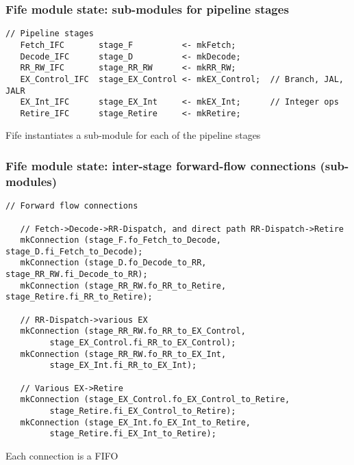 \begin{frame}[fragile]
\frametitle{Fife module state: sub-modules for pipeline stages}

\footnotesize

\begin{minipage}{0.75\textwidth}
\begin{Verbatim}[frame=single, label=From src\_Fife/CPU.bsv]
   // Pipeline stages
   Fetch_IFC       stage_F          <- mkFetch;
   Decode_IFC      stage_D          <- mkDecode;
   RR_RW_IFC       stage_RR_RW      <- mkRR_RW;
   EX_Control_IFC  stage_EX_Control <- mkEX_Control;  // Branch, JAL, JALR
   EX_Int_IFC      stage_EX_Int     <- mkEX_Int;      // Integer ops
   Retire_IFC      stage_Retire     <- mkRetire;
\end{Verbatim}
\end{minipage}
\hm
\begin{minipage}{0.22\textwidth}
Fife instantiates a sub-module for each of the pipeline stages
\end{minipage}



\end{frame}


\begin{frame}[fragile]
\frametitle{Fife module state: inter-stage forward-flow connections (sub-modules) }

\footnotesize

\begin{minipage}{0.75\textwidth}\scriptsize
\begin{Verbatim}[frame=single, label=From src\_Fife/CPU.bsv]
   // Forward flow connections

   // Fetch->Decode->RR-Dispatch, and direct path RR-Dispatch->Retire
   mkConnection (stage_F.fo_Fetch_to_Decode,  stage_D.fi_Fetch_to_Decode);
   mkConnection (stage_D.fo_Decode_to_RR,     stage_RR_RW.fi_Decode_to_RR);
   mkConnection (stage_RR_RW.fo_RR_to_Retire, stage_Retire.fi_RR_to_Retire);

   // RR-Dispatch->various EX
   mkConnection (stage_RR_RW.fo_RR_to_EX_Control,
		 stage_EX_Control.fi_RR_to_EX_Control);
   mkConnection (stage_RR_RW.fo_RR_to_EX_Int,
		 stage_EX_Int.fi_RR_to_EX_Int);

   // Various EX->Retire
   mkConnection (stage_EX_Control.fo_EX_Control_to_Retire,
		 stage_Retire.fi_EX_Control_to_Retire);
   mkConnection (stage_EX_Int.fo_EX_Int_to_Retire,
		 stage_Retire.fi_EX_Int_to_Retire);
\end{Verbatim}
\end{minipage}
\hm
\begin{minipage}{0.22\textwidth}
Each connection is a FIFO
\end{minipage}

\end{frame}

